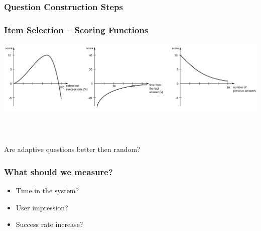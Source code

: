 \documentclass[xcolor=svgnames]{beamer}
\begin{document}
\begin{frame}
	\frametitle{Question Construction Steps}
\end{frame}
\begin{frame}
	\frametitle{Item Selection – Scoring Functions}
   \includegraphics[width=\textwidth]{img/3functions.png}
\end{frame}
\begin{frame}
  \frametitle{~}
\begin{center} 
\huge{Are adaptive questions better then random?}
\end{center}
\end{frame}
\begin{frame}
	\frametitle{What should we measure?}
  \begin{itemize}
    \item Time in the system? 
    \item User impression? 
    \item Success rate increase?
    \
  \end{itemize}
\end{frame}
\end{document}
